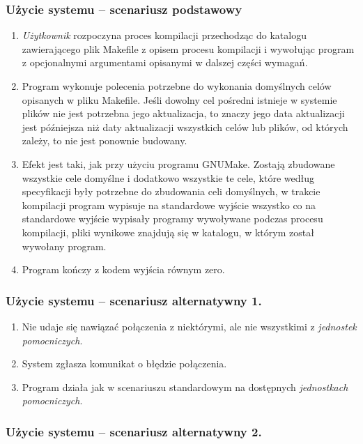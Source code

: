\documentclass[a4paper]{article}
\begin{document}
\subsubsection{Użycie systemu -- scenariusz podstawowy}

\begin{enumerate}
	\item \emph{Użytkownik} rozpoczyna proces kompilacji przechodząc do katalogu zawierającego plik Makefile z opisem procesu kompilacji i wywołując program z opcjonalnymi argumentami opisanymi w dalszej części wymagań.
	\item Program wykonuje polecenia potrzebne do wykonania domyślnych celów opisanych w pliku Makefile. Jeśli dowolny cel pośredni istnieje w systemie plików nie jest potrzebna jego aktualizacja, to znaczy jego data aktualizacji jest późniejsza niż daty aktualizacji wszystkich celów lub plików, od których zależy, to nie jest ponownie budowany.
	\item Efekt jest taki, jak przy użyciu programu GNUMake. Zostają zbudowane wszystkie cele domyślne i dodatkowo wszystkie te cele, które według specyfikacji były potrzebne do zbudowania celi domyślnych, w trakcie kompilacji program wypisuje na standardowe wyjście wszystko co na standardowe wyjście wypisały programy wywoływane podczas procesu kompilacji, pliki wynikowe znajdują się w katalogu, w którym został wywołany program.
	\item Program kończy z kodem wyjścia równym zero.
\end{enumerate}

\subsubsection{Użycie systemu -- scenariusz alternatywny 1.}

\begin{enumerate}
	\item Nie udaje się nawiązać połączenia z niektórymi, ale nie wszystkimi z \emph{jednostek pomocniczych}.
	\item System zgłasza komunikat o błędzie połączenia.
	\item Program działa jak w scenariuszu standardowym na dostępnych \emph{jednostkach pomocniczych}.
\end{enumerate}

\subsubsection{Użycie systemu -- scenariusz alternatywny 2.}
\end{document}

